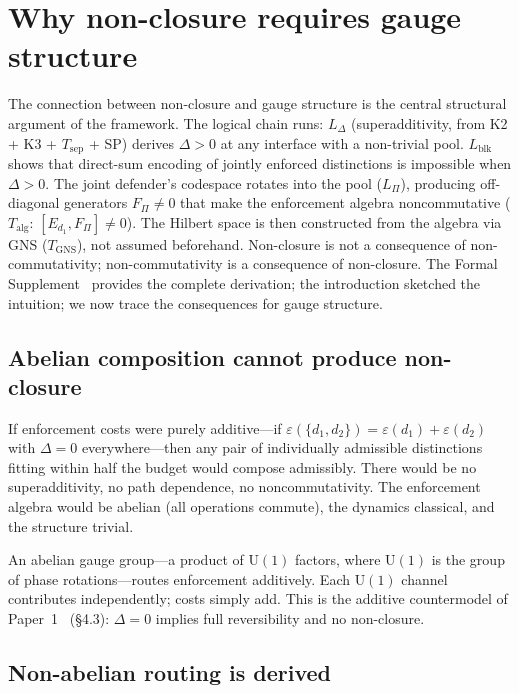 \documentclass[11pt]{article}
\newcommand{\U}{\mathrm{U}}
\begin{document}
\section{Why non-closure requires gauge structure}
\label{sec:gauge_origin}

The connection between non-closure and gauge structure is the central structural argument of the framework.  The logical chain runs: $L_\Delta$ (superadditivity, from K2 + K3 + $T_{\mathrm{sep}}$ + SP) derives $\Delta > 0$ at any interface with a non-trivial pool.  $L_{\mathrm{blk}}$ shows that direct-sum encoding of jointly enforced distinctions is impossible when $\Delta > 0$.  The joint defender's codespace rotates into the pool ($L_\Pi$), producing off-diagonal generators $F_\Pi \ne 0$ that make the enforcement algebra noncommutative ($T_{\mathrm{alg}}$: $[E_{d_1}, F_\Pi] \ne 0$).  The Hilbert space is then constructed from the algebra via GNS ($T_{\mathrm{GNS}}$), not assumed beforehand.  Non-closure is not a consequence of non-commutativity; non-commutativity is a consequence of non-closure.  The Formal Supplement~\cite{BrookeSupplement} provides the complete derivation; the introduction sketched the intuition; we now trace the consequences for gauge structure.

\subsection{Abelian composition cannot produce non-closure}

If enforcement costs were purely additive---if $\varepsilon(\{d_1, d_2\}) = \varepsilon(d_1) + \varepsilon(d_2)$ with $\Delta = 0$ everywhere---then any pair of individually admissible distinctions fitting within half the budget would compose admissibly.  There would be no superadditivity, no path dependence, no noncommutativity.  The enforcement algebra would be abelian (all operations commute), the dynamics classical, and the structure trivial.

An abelian gauge group---a product of $\U(1)$ factors, where $\U(1)$ is the group of phase rotations---routes enforcement additively.  Each $\U(1)$ channel contributes independently; costs simply add.  This is the additive countermodel of Paper~1~\cite{BrookePaper1} (\S4.3): $\Delta = 0$ implies full reversibility and no non-closure.

\subsection{Non-abelian routing is derived}
\end{document}
